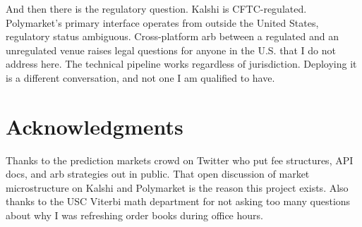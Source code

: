 \documentclass[11pt]{article}
\theoremstyle{definition}
\theoremstyle{remark}
\begin{document}
And then there is the regulatory question. Kalshi is CFTC-regulated. Polymarket's primary interface operates from outside the United States, regulatory status ambiguous. Cross-platform arb between a regulated and an unregulated venue raises legal questions for anyone in the U.S. that I do not address here. The technical pipeline works regardless of jurisdiction. Deploying it is a different conversation, and not one I am qualified to have.

\section*{Acknowledgments}

Thanks to the prediction markets crowd on Twitter who put fee structures, API docs, and arb strategies out in public. That open discussion of market microstructure on Kalshi and Polymarket is the reason this project exists. Also thanks to the USC Viterbi math department for not asking too many questions about why I was refreshing order books during office hours.



\end{document}
